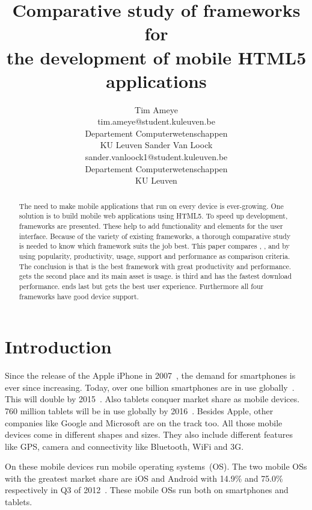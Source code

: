 \documentclass[a4paper]{artikel3}
\title{Comparative study of frameworks for \\ the development of mobile HTML5 applications}
\author{Tim Ameye \\ tim.ameye@student.kuleuven.be \\ Departement Computerwetenschappen \\ KU Leuven \And Sander Van Loock \\ sander.vanloock1@student.kuleuven.be \\ Departement Computerwetenschappen \\ KU Leuven}
\begin{document}
\maketitle

\begin{abstract}
The need to make mobile applications that run on every device is ever-growing.
One solution is to build mobile web applications using HTML5.
To speed up development,  frameworks are presented.
These help to add functionality and elements for the user interface.
Because of the variety of existing frameworks, a thorough comparative study is needed to know which framework suits the job best.
This paper compares \st{}, \jqm{}, \kendo{} and \lungo{} by using popularity, productivity, usage, support and performance as comparison criteria. 
The conclusion is that \jqm{} is the best framework with great productivity and performance. 
\kendo{} gets the second place and its main asset is usage.
\lungo{} is third and has the fastest download performance.
\st{} ends last but gets the best user experience.
Furthermore all four frameworks have good device support.
\end{abstract}


\section{Introduction} %
\label{sec:introduction}
Since the release of the Apple iPhone in 2007~\cite{David2011}, the demand for smartphones is ever since increasing. 
Today, over one billion smartphones are in use globally~\cite{Yang2012}.
This will double by 2015~\cite{Gillett2012}.
Also tablets conquer market share as mobile devices.
760 million tablets will be in use globally by 2016~\cite{Gillett2012}.
Besides Apple, other companies like Google and Microsoft are on the track too.
All those mobile devices come in different shapes and sizes.
They also include different features like GPS, camera and connectivity like Bluetooth, WiFi and 3G.

On these mobile devices run mobile operating systems~(OS). The two mobile OSs with the greatest market share are iOS and Android with 14.9\% and 75.0\% respectively in Q3 of 2012~\cite{Protalinski2012}.
These mobile OSs run both on smartphones and tablets.
\end{document}
